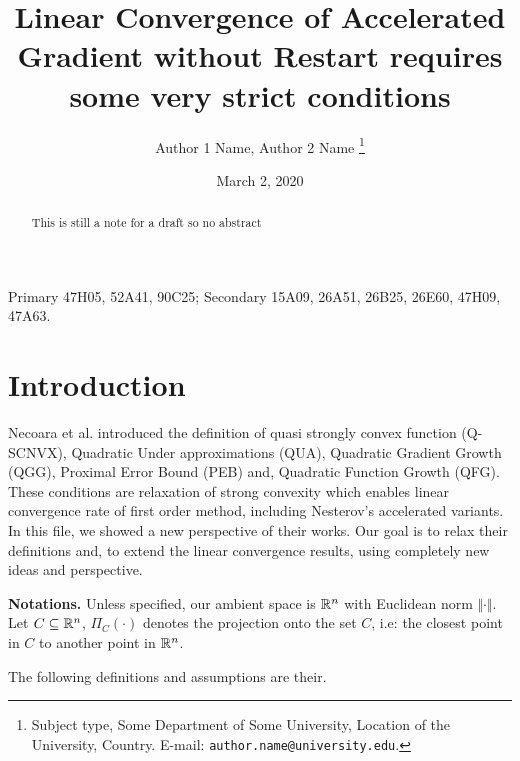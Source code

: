 \documentclass[12pt]{article}
\begin{document}
\newcommand{\dist}{\ensuremath{\operatorname{dist}}}

\title{{\selectfont Linear Convergence of Accelerated Gradient without Restart requires some very strict conditions}}

\author{
    Author 1 Name, Author 2 Name
    \thanks{
        Subject type, Some Department of Some University, Location of the University,
        Country. E-mail: \texttt{author.name@university.edu}.
    }
}

\date{March 2, 2020}

\maketitle
{}

\begin{abstract} 
    \noindent
    This is still a note for a draft so no abstract \cite{bauschke_convex_2017}
\end{abstract}

Primary 47H05, 52A41, 90C25; Secondary 15A09, 26A51, 26B25, 26E60, 47H09, 47A63.


\section{Introduction}
    Necoara et al. \cite{necoara_linear_2019}  introduced the definition of quasi strongly convex function (Q-SCNVX), Quadratic Under approximations (QUA), Quadratic Gradient Growth (QGG), Proximal Error Bound (PEB) and, Quadratic Function Growth (QFG). 
    These conditions are relaxation of strong convexity which enables linear convergence rate of first order method, including Nesterov's accelerated variants. 
    In this file, we showed a new perspective of their works. 
    Our goal is to relax their definitions and, to extend the linear convergence results, using completely new ideas and perspective. 
    \par
    \textbf{Notations.}
    Unless specified, our ambient space is $\mathbb R^n$ with Euclidean norm $\Vert \cdot\Vert$.
    Let $C\subseteq \mathbb R^n$, $\Pi_C(\cdot)$ denotes the projection onto the set $C$, i.e: the closest point in $C$ to another point in $\mathbb R^n$. 
    \par
    The following definitions and assumptions are their. 
    
\end{document}
